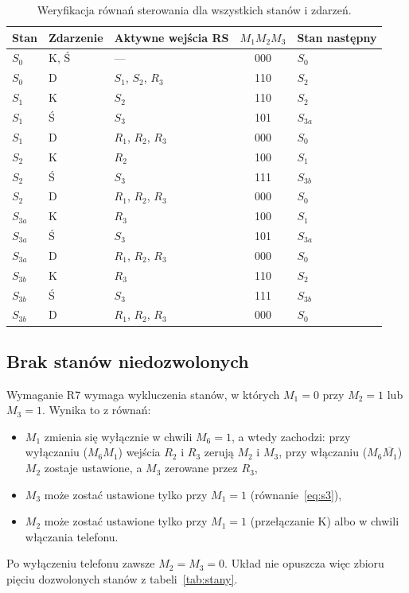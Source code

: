 \begin{table}[H]
\centering
\caption{Weryfikacja równań sterowania dla wszystkich stanów i zdarzeń.}
\label{tab:weryfikacja}
\begin{tabular}{lll|c|l}
\toprule
Stan & Zdarzenie & Aktywne wejścia RS & $M_1M_2M_3$ & Stan następny \\
\midrule
$S_0$    & K, Ś & --- & 000 & $S_0$ \\
$S_0$    & D & $S_1$, $S_2$, $R_3$ & 110 & $S_2$ \\
$S_1$    & K & $S_2$ & 110 & $S_2$ \\
$S_1$    & Ś & $S_3$ & 101 & $S_{3a}$ \\
$S_1$    & D & $R_1$, $R_2$, $R_3$ & 000 & $S_0$ \\
$S_2$    & K & $R_2$ & 100 & $S_1$ \\
$S_2$    & Ś & $S_3$ & 111 & $S_{3b}$ \\
$S_2$    & D & $R_1$, $R_2$, $R_3$ & 000 & $S_0$ \\
$S_{3a}$ & K & $R_3$ & 100 & $S_1$ \\
$S_{3a}$ & Ś & $S_3$ & 101 & $S_{3a}$ \\
$S_{3a}$ & D & $R_1$, $R_2$, $R_3$ & 000 & $S_0$ \\
$S_{3b}$ & K & $R_3$ & 110 & $S_2$ \\
$S_{3b}$ & Ś & $S_3$ & 111 & $S_{3b}$ \\
$S_{3b}$ & D & $R_1$, $R_2$, $R_3$ & 000 & $S_0$ \\
\bottomrule
\end{tabular}
\end{table}

\subsection{Brak stanów niedozwolonych}
\label{sec:niedozwolone}
Wymaganie R7 wymaga wykluczenia stanów, w których $M_1=0$ przy
$M_2=1$ lub $M_3=1$. Wynika to z równań:
\begin{itemize}
    \item $M_1$ zmienia się wyłącznie w chwili $M_6=1$, a wtedy
          zachodzi: przy wyłączaniu ($M_6 M_1$) wejścia $R_2$ i $R_3$
          zerują $M_2$ i $M_3$, przy włączaniu ($M_6 \overline{M_1}$)
          $M_2$ zostaje ustawione, a $M_3$ zerowane przez $R_3$,
    \item $M_3$ może zostać ustawione tylko przy $M_1=1$ (równanie~\eqref{eq:s3}),
    \item $M_2$ może zostać ustawione tylko przy $M_1=1$ (przełączanie K)
          albo w chwili włączania telefonu.
\end{itemize}
Po wyłączeniu telefonu zawsze $M_2 = M_3 = 0$. Układ nie opuszcza więc
zbioru pięciu dozwolonych stanów z tabeli~\ref{tab:stany}.
